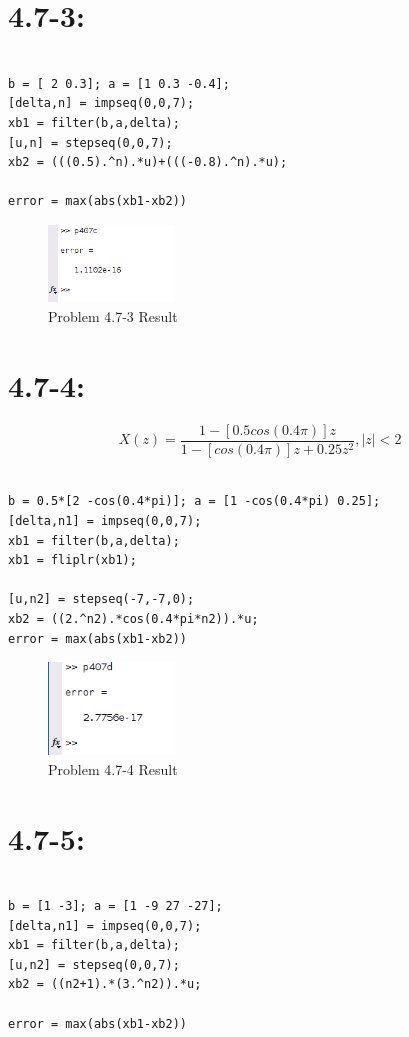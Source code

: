 \documentclass[11pt
  , a4paper
  , article
  , oneside
]{memoir}
\begin{document}
\section{4.7-3: }
\begin{lstlisting}[style=termstyle]
%Problem 4.7-3

b = [ 2 0.3]; a = [1 0.3 -0.4]; 
[delta,n] = impseq(0,0,7);
xb1 = filter(b,a,delta);
[u,n] = stepseq(0,0,7); 
xb2 = (((0.5).^n).*u)+(((-0.8).^n).*u);

error = max(abs(xb1-xb2))
\end{lstlisting}

\begin{figure}[h!]
	\centering
	\includegraphics[width=0.3\textwidth,height=0.1\textwidth]{./images/p407c.png}
	\caption{Problem 4.7-3 Result}
	\label{fig:Problem 4.7-3 Result}
\end{figure}


\section{4.7-4: }
\begin {equation}
X(z) = \frac{1-[0.5cos(0.4\pi)]z}{1-[cos(0.4\pi)]z+0.25z^2}, |z| < 2
\end {equation}


\begin{lstlisting}[style=termstyle]
%Problme 4.7-4

b = 0.5*[2 -cos(0.4*pi)]; a = [1 -cos(0.4*pi) 0.25];
[delta,n1] = impseq(0,0,7); 
xb1 = filter(b,a,delta); 
xb1 = fliplr(xb1);

[u,n2] = stepseq(-7,-7,0); 
xb2 = ((2.^n2).*cos(0.4*pi*n2)).*u;
error = max(abs(xb1-xb2))
\end{lstlisting}

\begin{figure}[h!]
	\centering
	\includegraphics[width=0.3\textwidth,height=0.1\textwidth]{./images/p407d.png}
	\caption{Problem 4.7-4 Result}
	\label{fig:Problem 4.7-4 Result}
\end{figure}

\section{4.7-5: }
\begin{lstlisting}[style=termstyle]
%Problem 4.7-5

b = [1 -3]; a = [1 -9 27 -27]; 
[delta,n1] = impseq(0,0,7);
xb1 = filter(b,a,delta);
[u,n2] = stepseq(0,0,7); 
xb2 = ((n2+1).*(3.^n2)).*u;

error = max(abs(xb1-xb2))
\end{lstlisting}
\end{document}
